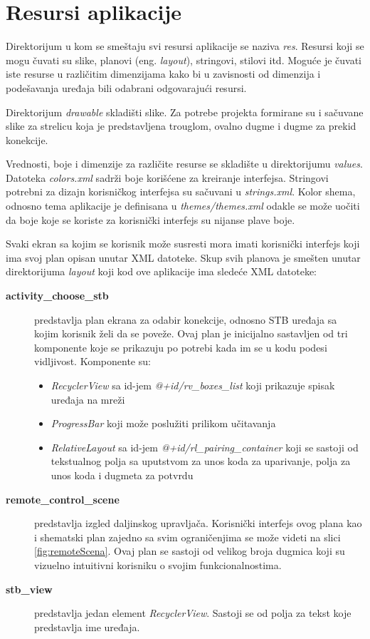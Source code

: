 \documentclass[implementacija.tex]{subfiles}
\begin{document}



\section{Resursi aplikacije}
Direktorijum u kom se smeštaju svi resursi aplikacije se naziva \textit{res}. Resursi koji se mogu čuvati su slike, planovi (eng. \textit{layout}), stringovi, stilovi itd. Moguće je čuvati iste resurse u različitim dimenzijama kako bi u zavisnosti od dimenzija i podešavanja uređaja bili odabrani odgovarajući resursi.

Direktorijum \textit{drawable} skladišti slike. Za potrebe projekta formirane su i sačuvane slike za strelicu koja je predstavljena trouglom, ovalno dugme i dugme za prekid konekcije. 

Vrednosti, boje i dimenzije za različite resurse se skladište u direktorijumu \textit{values}. Datoteka \textit{colors.xml} sadrži boje korišćene za kreiranje interfejsa. Stringovi potrebni za dizajn korisničkog interfejsa su sačuvani u \textit{strings.xml}. Kolor shema, odnosno tema aplikacije je definisana u \textit{themes/themes.xml} odakle se može uočiti da boje koje se koriste za korisnički interfejs su nijanse plave boje. 

Svaki ekran sa kojim se korisnik može susresti mora imati korisnički interfejs koji ima svoj plan opisan unutar XML datoteke. Skup svih planova je smešten unutar direktorijuma \textit{layout} koji kod ove aplikacije ima sledeće XML datoteke:
\begin{description}
\item[\textbf{activity\_choose\_stb}] predstavlja plan ekrana za odabir konekcije, odnosno STB uređaja sa kojim korisnik želi da se poveže. Ovaj plan je inicijalno sastavljen od tri komponente koje se prikazuju po potrebi kada im se u kodu podesi vidljivost. Komponente su:
\begin{itemize}
    \item \textit{RecyclerView} sa id-jem \textit{@+id/rv\_boxes\_list} koji prikazuje spisak uređaja na mreži
    \item \textit{ProgressBar} koji može poslužiti prilikom učitavanja
    \item \textit{RelativeLayout} sa id-jem \textit{@+id/rl\_pairing\_container} koji se sastoji od tekstualnog polja sa uputstvom za unos koda za uparivanje, polja za unos koda i dugmeta za potvrdu 
\end{itemize}
\item[\textbf{remote\_control\_scene}] predstavlja izgled daljinskog upravljača. Korisnički interfejs ovog plana kao i shematski plan zajedno sa svim ograničenjima se može videti na slici \ref{fig:remoteScena}. Ovaj plan se sastoji od velikog broja dugmica koji su vizuelno intuitivni korisniku o svojim funkcionalnostima.
\item[\textbf{stb\_view}] predstavlja jedan element \textit{RecyclerView}. Sastoji se od polja za tekst koje predstavlja ime uređaja. 
\end{description}
\end{document}
